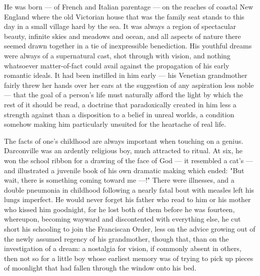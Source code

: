   He was born --- of French and Italian parentage --- on the reaches of coastal New
England where the old Victorian house that was the family seat stands to this
day in a small village hard by the sea. It was always a region of spectacular
beauty, infinite skies and meadows and ocean, and all aspects of nature there
seemed drawn together in a tie of inexpressible benediction. His youthful dreams
were always of a supernatural cast, shot through with vision, and nothing
whatsoever matter-of-fact could avail against the propagation of his early
romantic ideals. It had been instilled in him early --- his Venetian grandmother
fairly threw her hands over her ears at the suggestion of any aspiration less
noble --- that the goal of a person's life must naturally afford the light by which
the rest of it should be read, a doctrine that paradoxically created in him less
a strength against than a disposition to a belief in unreal worlds, a condition
somehow making him particularly unsuited for the heartache of real life.

  The facts of one's childhood are always important when touching on a genius.
Darconville was an ardently religious boy, much attracted to ritual. At six, he
won the school ribbon for a drawing of the face of God --- it resembled a cat's
--- and illustrated a juvenile book of his own dramatic making which ended: 
"But wait, there is something coming toward me ---!" There were illnesses, and 
a double pneumonia in childhood following a nearly fatal bout with measles 
left his lungs imperfect. He would never forget his father who read to 
him or his mother who kissed him goodnight, for he lost both of them before 
he was fourteen, whereupon, becoming wayward 
and discontented with everything else, he cut short
his schooling to join the Franciscan Order, less on the advice growing out of
the newly assumed regency of his grandmother, though that, than on the
investigation of a dream: a nostalgia 
for vision, if commonly absent in others, then not so for a little boy 
whose earliest memory was of trying to pick up pieces of moonlight that had 
fallen through the window onto his bed.

